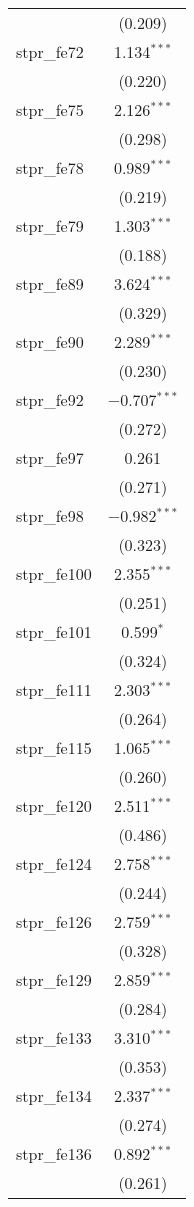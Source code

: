 \begin{table}[!htbp]
\begin{tabular}{@{\extracolsep{5pt}}lc}
  & (0.209) \\ 
  stpr\_fe72 & 1.134$^{***}$ \\ 
  & (0.220) \\ 
  stpr\_fe75 & 2.126$^{***}$ \\ 
  & (0.298) \\ 
  stpr\_fe78 & 0.989$^{***}$ \\ 
  & (0.219) \\ 
  stpr\_fe79 & 1.303$^{***}$ \\ 
  & (0.188) \\ 
  stpr\_fe89 & 3.624$^{***}$ \\ 
  & (0.329) \\ 
  stpr\_fe90 & 2.289$^{***}$ \\ 
  & (0.230) \\ 
  stpr\_fe92 & $-$0.707$^{***}$ \\ 
  & (0.272) \\ 
  stpr\_fe97 & 0.261 \\ 
  & (0.271) \\ 
  stpr\_fe98 & $-$0.982$^{***}$ \\ 
  & (0.323) \\ 
  stpr\_fe100 & 2.355$^{***}$ \\ 
  & (0.251) \\ 
  stpr\_fe101 & 0.599$^{*}$ \\ 
  & (0.324) \\ 
  stpr\_fe111 & 2.303$^{***}$ \\ 
  & (0.264) \\ 
  stpr\_fe115 & 1.065$^{***}$ \\ 
  & (0.260) \\ 
  stpr\_fe120 & 2.511$^{***}$ \\ 
  & (0.486) \\ 
  stpr\_fe124 & 2.758$^{***}$ \\ 
  & (0.244) \\ 
  stpr\_fe126 & 2.759$^{***}$ \\ 
  & (0.328) \\ 
  stpr\_fe129 & 2.859$^{***}$ \\ 
  & (0.284) \\ 
  stpr\_fe133 & 3.310$^{***}$ \\ 
  & (0.353) \\ 
  stpr\_fe134 & 2.337$^{***}$ \\ 
  & (0.274) \\ 
  stpr\_fe136 & 0.892$^{***}$ \\ 
  & (0.261) \\ 

\end{tabular}
\end{table}
